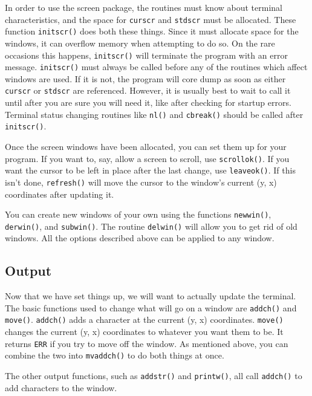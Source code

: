 \label{f0:starting}In order to use the screen package, the routines must know about terminal
characteristics, and the space for \texttt{curscr} and \texttt{stdscr} must be
allocated.  These function \texttt{initscr()} does both these things. Since it
must allocate space for the windows, it can overflow memory when attempting to
do so. On the rare occasions this happens, \texttt{initscr()} will terminate
the program with an error message.  \texttt{initscr()} must always be called
before any of the routines which affect windows are used.  If it is not, the
program will core dump as soon as either \texttt{curscr} or \texttt{stdscr} are
referenced.  However, it is usually best to wait to call it until after you are
sure you will need it, like after checking for startup errors.  Terminal status
changing routines like \texttt{nl()} and \texttt{cbreak()} should be called
after \texttt{initscr()}. 

Once the screen windows have been allocated, you can set them up for
your program.  If you want to, say, allow a screen to scroll, use
\texttt{scrollok()}.  If you want the cursor to be left in place after
the last change, use \texttt{leaveok()}.  If this isn't done,
\texttt{refresh()} will move the cursor to the window's current (y, x)
coordinates after updating it. 

You can create new windows of your own using the functions \texttt{newwin()},
\texttt{derwin()}, and \texttt{subwin()}.  The routine \texttt{delwin()} will
allow you to get rid of old windows.  All the options described above can be
applied to any window.

\subsection{Output}

\label{f0:output}Now that we have set things up, we will want to actually update the terminal.
The basic functions used to change what will go on a window are
\texttt{addch()} and \texttt{move()}.  \texttt{addch()} adds a character at the
current (y, x) coordinates.  \texttt{move()} changes the current (y, x)
coordinates to whatever you want them to be.  It returns \texttt{ERR} if you
try to move off the window.  As mentioned above, you can combine the two into
\texttt{mvaddch()} to do both things at once. 

The other output functions, such as \texttt{addstr()} and \texttt{printw()},
all call \texttt{addch()} to add characters to the window. 

